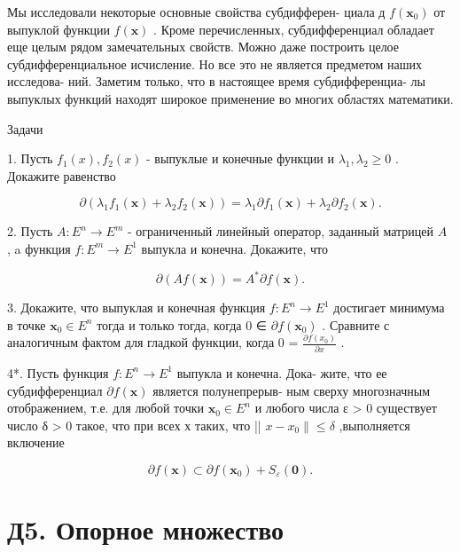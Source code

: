 \documentclass[8pt]{extarticle}
\begin{document}
Мы исследовали некоторые основные свойства субдифферен- циала д \(f\left( {\mathbf{x}}_{0}\right)\) от выпуклой функции \(f\left( \mathbf{x}\right)\) . Кроме перечисленных, субдифференциал обладает еще целым рядом замечательных свойств. Можно даже построить целое субдифференциальное исчисление. Но все это не является предметом наших исследова- ний. Заметим только, что в настоящее время субдифференциа- лы выпуклых функций находят широкое применение во многих областях математики.

Задачи

1. Пусть \({f}_{1}\left( x\right) ,{f}_{2}\left( x\right)\) - выпуклые и конечные функции и \({\lambda }_{1},{\lambda }_{2} \geq  0\) . Докажите равенство

\[
\partial \left( {{\lambda }_{1}{f}_{1}\left( \mathbf{x}\right)  + {\lambda }_{2}{f}_{2}\left( \mathbf{x}\right) }\right)  = {\lambda }_{1}\partial {f}_{1}\left( \mathbf{x}\right)  + {\lambda }_{2}\partial {f}_{2}\left( \mathbf{x}\right) .
\]

2. Пусть \(A : {E}^{n} \rightarrow  {E}^{m}\) - ограниченный линейный оператор, заданный матрицей \(A\) , a функция \(f : {E}^{m} \rightarrow  {E}^{1}\) выпукла и конечна. Докажите, что

\[
\partial \left( {{Af}\left( \mathbf{x}\right) }\right)  = {A}^{ * }\partial f\left( \mathbf{x}\right) .
\]

3. Докажите, что выпуклая и конечная функция \(f : {E}^{n} \rightarrow  {E}^{1}\) достигает минимума в точке \({\mathbf{x}}_{0} \in  {E}^{n}\) тогда и только тогда, когда 0 ∈ \(\partial f\left( {\mathbf{x}}_{0}\right)\) . Сравните с аналогичным фактом для гладкой функции, когда 0 = \(\frac{\partial f\left( {x}_{0}\right) }{\partial x}\) .

4*. Пусть функция \(f : {E}^{n} \rightarrow  {E}^{1}\) выпукла и конечна. Дока- жите, что ее субдифференциал \(\partial f\left( \mathbf{x}\right)\) является полунепрерыв- ным сверху многозначным отображением, т.е. для любой точки \({\mathbf{x}}_{0} \in  {E}^{n}\) и любого числа ε > 0 существует число δ > 0 такое, что при всех х таких, что || \(x - {x}_{0}\parallel  \leq  \delta\) ,выполняется включение

\[
\partial f\left( \mathbf{x}\right)  \subset  \partial f\left( {\mathbf{x}}_{0}\right)  + {S}_{\varepsilon }\left( \mathbf{0}\right) .
\]

\section*{Д5. Опорное множество}
\end{document}
